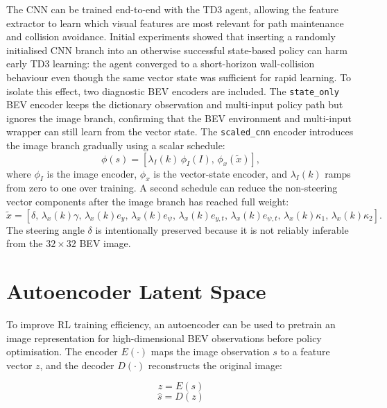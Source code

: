 The CNN can be trained end-to-end with the TD3 agent, allowing the feature extractor to learn which visual features are most relevant for path maintenance and collision avoidance. Initial experiments showed that inserting a randomly initialised CNN branch into an otherwise successful state-based policy can harm early TD3 learning: the agent converged to a short-horizon wall-collision behaviour even though the same vector state was sufficient for rapid learning. To isolate this effect, two diagnostic BEV encoders are included. The \texttt{state\_only} BEV encoder keeps the dictionary observation and multi-input policy path but ignores the image branch, confirming that the BEV environment and multi-input wrapper can still learn from the vector state. The \texttt{scaled\_cnn} encoder introduces the image branch gradually using a scalar schedule:
\begin{equation}
    \phi(s) =
    \left[
    \lambda_I(k)\,\phi_I(I),\,
    \phi_x(\tilde{x})
    \right],
    \label{eq:scaled_cnn_features}
\end{equation}
where $\phi_I$ is the image encoder, $\phi_x$ is the vector-state encoder, and $\lambda_I(k)$ ramps from zero to one over training. A second schedule can reduce the non-steering vector components after the image branch has reached full weight:
\begin{equation}
    \tilde{x} =
    [\delta,\,
    \lambda_x(k)\gamma,\,
    \lambda_x(k)e_y,\,
    \lambda_x(k)e_\psi,\,
    \lambda_x(k)e_{y,t},\,
    \lambda_x(k)e_{\psi,t},\,
    \lambda_x(k)\kappa_1,\,
    \lambda_x(k)\kappa_2].
    \label{eq:state_scale_features}
\end{equation}
The steering angle $\delta$ is intentionally preserved because it is not reliably inferable from the $32 \times 32$ BEV image.

\section{Autoencoder Latent Space}

To improve RL training efficiency, an autoencoder can be used to pretrain an image representation for high-dimensional BEV observations before policy optimisation. The encoder $E(\cdot)$ maps the image observation $s$ to a feature vector $z$, and the decoder $D(\cdot)$ reconstructs the original image:

\begin{equation}
    z = E(s)
    \label{eq:encoder}
\end{equation}
\begin{equation}
    \hat{s} = D(z)
    \label{eq:decoder}
\end{equation}

